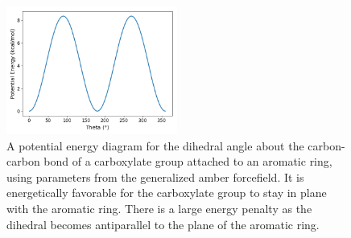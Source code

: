 \documentclass{article}
\begin{document}
  \begin{figure}[!htb]
  \centering
  \includegraphics[width=0.5\textwidth]{carboxylate_dihedral_rb.png}
  \caption{A potential energy diagram for the dihedral angle about the carbon-carbon bond of
  a carboxylate group attached to an aromatic ring, using parameters from the generalized amber 
  forcefield. It is energetically favorable for the carboxylate group to stay in plane with 
  the aromatic ring. There is a large energy penalty as the dihedral becomes antiparallel to 
  the plane of the aromatic ring.}\label{fig:carboxylate_dihedral_rb}
  \end{figure}

\end{document}
